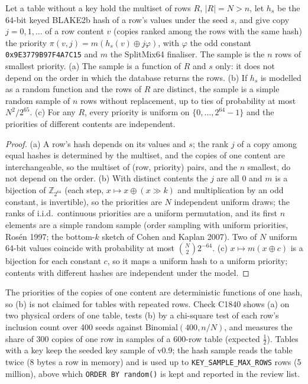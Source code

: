 \setcounter{proposition}{1839}
\begin{proposition}\label{prop:keylesssample}
Let a table without a key hold the multiset of rows $R$, $|R|=N>n$, let $h_s$ be the 64-bit keyed BLAKE2b hash of a row's values under the seed $s$, and give copy $j=0,1,\dots$ of a row content $v$ (copies ranked among the rows with the same hash) the priority $\pi(v,j)=m(h_s(v)\oplus j\varphi)$, with $\varphi$ the odd constant \texttt{0x9E3779B97F4A7C15} and $m$ the SplitMix64 finaliser. The sample is the $n$ rows of smallest priority. (a) The sample is a function of $R$ and $s$ only: it does not depend on the order in which the database returns the rows. (b) If $h_s$ is modelled as a random function and the rows of $R$ are distinct, the sample is a simple random sample of $n$ rows without replacement, up to ties of probability at most $N^2/2^{65}$. (c) For any $R$, every priority is uniform on $\{0,\dots,2^{64}-1\}$ and the priorities of different contents are independent.
\end{proposition}
\begin{proof}
(a) A row's hash depends on its values and $s$; the rank $j$ of a copy among equal hashes is determined by the multiset, and the copies of one content are interchangeable, so the multiset of (row, priority) pairs, and the $n$ smallest, do not depend on the order. (b) With distinct contents the $j$ are all 0 and $m$ is a bijection of $\mathbb Z_{2^{64}}$ (each step, $x\mapsto x\oplus(x\gg k)$ and multiplication by an odd constant, is invertible), so the priorities are $N$ independent uniform draws; the ranks of i.i.d.\ continuous priorities are a uniform permutation, and its first $n$ elements are a simple random sample (order sampling with uniform priorities, Ros\'en 1997; the bottom-$k$ sketch of Cohen and Kaplan 2007). Two of $N$ uniform 64-bit values coincide with probability at most $\binom N2 2^{-64}$. (c) $x\mapsto m(x\oplus c)$ is a bijection for each constant $c$, so it maps a uniform hash to a uniform priority; contents with different hashes are independent under the model.
\end{proof}
\noindent The priorities of the copies of one content are deterministic functions of one hash, so (b) is not claimed for tables with repeated rows. Check C1840 shows (a) on two physical orders of one table, tests (b) by a chi-square test of each row's inclusion count over 400 seeds against $\mathrm{Binomial}(400,n/N)$, and measures the share of 300 copies of one row in samples of a 600-row table (expected $\frac12$). Tables with a key keep the seeded key sample of v0.9; the hash sample reads the table twice (8 bytes a row in memory) and is used up to \texttt{KEY\_SAMPLE\_MAX\_ROWS} rows (5 million), above which \texttt{ORDER BY random()} is kept and reported in the review list.

